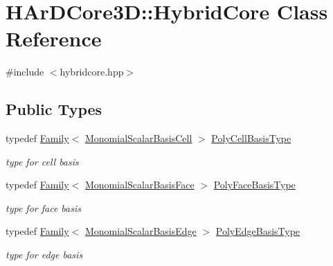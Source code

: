\hypertarget{classHArDCore3D_1_1HybridCore}{}\section{H\+Ar\+D\+Core3D\+:\+:Hybrid\+Core Class Reference}
\label{classHArDCore3D_1_1HybridCore}


{\ttfamily \#include $<$hybridcore.\+hpp$>$}

\subsection*{Public Types}
\begin{DoxyCompactItemize}
\item 
\mbox{\label{classHArDCore3D_1_1HybridCore_a5c478c9953257f154d2ea98f115fba0d}} 
typedef \hyperlink{classHArDCore3D_1_1Family}{Family}$<$ \hyperlink{classHArDCore3D_1_1MonomialScalarBasisCell}{Monomial\+Scalar\+Basis\+Cell} $>$ \hyperlink{classHArDCore3D_1_1HybridCore_a5c478c9953257f154d2ea98f115fba0d}{Poly\+Cell\+Basis\+Type}
\begin{DoxyCompactList}\small\item\em type for cell basis \end{DoxyCompactList}\item 
\mbox{\label{classHArDCore3D_1_1HybridCore_ab02b7a4490b6a739e2d084e9a70dbcc5}} 
typedef \hyperlink{classHArDCore3D_1_1Family}{Family}$<$ \hyperlink{classHArDCore3D_1_1MonomialScalarBasisFace}{Monomial\+Scalar\+Basis\+Face} $>$ \hyperlink{classHArDCore3D_1_1HybridCore_ab02b7a4490b6a739e2d084e9a70dbcc5}{Poly\+Face\+Basis\+Type}
\begin{DoxyCompactList}\small\item\em type for face basis \end{DoxyCompactList}\item 
\mbox{\label{classHArDCore3D_1_1HybridCore_ad3123dceabd79eec7cdb57ba1014fc17}} 
typedef \hyperlink{classHArDCore3D_1_1Family}{Family}$<$ \hyperlink{classHArDCore3D_1_1MonomialScalarBasisEdge}{Monomial\+Scalar\+Basis\+Edge} $>$ \hyperlink{classHArDCore3D_1_1HybridCore_ad3123dceabd79eec7cdb57ba1014fc17}{Poly\+Edge\+Basis\+Type}
\begin{DoxyCompactList}\small\item\em type for edge basis \end{DoxyCompactList}\end{DoxyCompactItemize}
